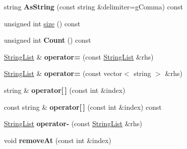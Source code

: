 \begin{DoxyCompactItemize}
\item 
\hypertarget{classrr_1_1_string_list_ad6bf19c146da22b4ecad78c727e0b4d1}{string {\bfseries As\-String} (const string \&delimiter=g\-Comma) const }\label{classrr_1_1_string_list_ad6bf19c146da22b4ecad78c727e0b4d1}

\item 
unsigned int \hyperlink{classrr_1_1_string_list_a1999115853a76d4cabfa476d599c9213}{size} () const 
\item 
\hypertarget{classrr_1_1_string_list_a7bdc8932c782485cfef8887a9a18ea7a}{unsigned int {\bfseries Count} () const }\label{classrr_1_1_string_list_a7bdc8932c782485cfef8887a9a18ea7a}

\item 
\hypertarget{classrr_1_1_string_list_a6c1105291422ce9d314ced358b3aa26d}{\hyperlink{classrr_1_1_string_list}{String\-List} \& {\bfseries operator=} (const \hyperlink{classrr_1_1_string_list}{String\-List} \&rhs)}\label{classrr_1_1_string_list_a6c1105291422ce9d314ced358b3aa26d}

\item 
\hypertarget{classrr_1_1_string_list_a918119997a8ac1b35865d34248e8adec}{\hyperlink{classrr_1_1_string_list}{String\-List} \& {\bfseries operator=} (const vector$<$ string $>$ \&rhs)}\label{classrr_1_1_string_list_a918119997a8ac1b35865d34248e8adec}

\item 
\hypertarget{classrr_1_1_string_list_a0606a8473b3a05b25e302510fd1be475}{string \& {\bfseries operator\mbox{[}$\,$\mbox{]}} (const int \&index)}\label{classrr_1_1_string_list_a0606a8473b3a05b25e302510fd1be475}

\item 
\hypertarget{classrr_1_1_string_list_a524fd5206874a39a6fcfb32ad7270c47}{const string \& {\bfseries operator\mbox{[}$\,$\mbox{]}} (const int \&index) const }\label{classrr_1_1_string_list_a524fd5206874a39a6fcfb32ad7270c47}

\item 
\hypertarget{classrr_1_1_string_list_aec22d26cfade4c47a66867b14c43b4ea}{\hyperlink{classrr_1_1_string_list}{String\-List} {\bfseries operator-\/} (const \hyperlink{classrr_1_1_string_list}{String\-List} \&rhs)}\label{classrr_1_1_string_list_aec22d26cfade4c47a66867b14c43b4ea}

\item 
\hypertarget{classrr_1_1_string_list_a34aec4f3478e6c3e6ddcf8a19e13f492}{void {\bfseries remove\-At} (const int \&index)}\label{classrr_1_1_string_list_a34aec4f3478e6c3e6ddcf8a19e13f492}


\end{DoxyCompactItemize}
